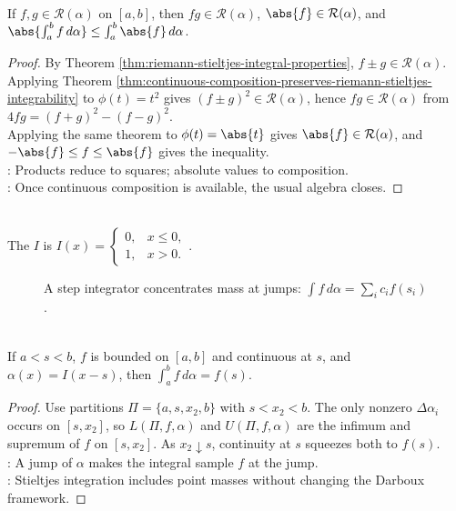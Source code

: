 \begin{theorem} \label{thm:products-and-absolute-values-riemann-stieltjes} \\
If $f,g\in\mathcal{R}(\alpha)$ on $[a,b]$, then $fg\in\mathcal{R}(\alpha)$, $\abs{f}\in\mathcal{R}(\alpha)$, and $\abs{\int_a^b f\,d\alpha}\leq\int_a^b\abs{f}\,d\alpha$.
\begin{proof}
By Theorem \ref{thm:riemann-stieltjes-integral-properties}, $f\pm g\in\mathcal{R}(\alpha)$. Applying Theorem \ref{thm:continuous-composition-preserves-riemann-stieltjes-integrability} to $\phi(t)=t^2$ gives $(f\pm g)^2\in\mathcal{R}(\alpha)$, hence $fg\in\mathcal{R}(\alpha)$ from $4fg=(f+g)^2-(f-g)^2$.\\
Applying the same theorem to $\phi(t)=\abs{t}$ gives $\abs{f}\in\mathcal{R}(\alpha)$, and $-\abs{f}\leq f\leq\abs{f}$ gives the inequality.\\
: Products reduce to squares; absolute values to composition.\\
: Once continuous composition is available, the usual algebra closes.
\end{proof}
\end{theorem}

\begin{definition} \label{def:unit-step-function-analysis} \\
The  $I$ is $I(x)=
\begin{cases}
0,&x\leq0,\\
1,&x>0.
\end{cases}$.
\end{definition}

\begin{figure}[H]
  \centering
  
  \caption{A step integrator concentrates mass at jumps: $\int f\,d\alpha=\sum_i c_i f(s_i)$.}
  \label{fig:riemann-stieltjes-step-integrator}
\end{figure}

\begin{theorem} \label{thm:single-step-riemann-stieltjes-integral} \\
If $a<s<b$, $f$ is bounded on $[a,b]$ and continuous at $s$, and $\alpha(x)=I(x-s)$, then $\int_a^b f\,d\alpha=f(s)$.
\begin{proof}
Use partitions $\Pi=\{a,s,x_2,b\}$ with $s<x_2<b$. The only nonzero $\Delta\alpha_i$ occurs on $[s,x_2]$, so $L(\Pi,f,\alpha)$ and $U(\Pi,f,\alpha)$ are the infimum and supremum of $f$ on $[s,x_2]$. As $x_2\downarrow s$, continuity at $s$ squeezes both to $f(s)$.\\
: A jump of $\alpha$ makes the integral sample $f$ at the jump.\\
: Stieltjes integration includes point masses without changing the Darboux framework.
\end{proof}
\end{theorem}

